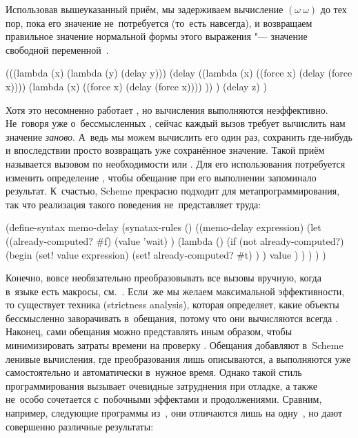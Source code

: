 Использовав вышеуказанный приём, мы задерживаем вычисление $(\omega\ \omega)$ до
тех пор, пока его значение не~потребуется (то~есть навсегда), и возвращаем
правильное значение нормальной формы этого выражения "--- значение свободной
переменной~.

\begin{code:lisp}
(((lambda (x) (lambda (y) (delay y)))
  (delay ((lambda (x) ((force x) (delay (force x))))
          (lambda (x) ((force x) (delay (force x)))) )) )
 (delay z) )
\end{code:lisp}

Хотя это несомненно работает \cite{dh92}, но вычисления выполняются
неэффективно. Не~говоря уже о~бессмысленных , сейчас
каждый вызов  требует вычислить нам значение \emph{заново}. А~ведь
мы можем вычислить его один раз, сохранить где-нибудь и впоследствии просто
возвращать уже сохранённое значение. Такой приём называется вызовом по
необходимости или . Для его использования потребуется изменить
определение , чтобы обещание при его выполнении запоминало результат.
К~счастью, Scheme прекрасно подходит для метапрограммирования, так что
реализация такого поведения не~представляет труда:

\begin{code:lisp}
(define-syntax memo-delay
  (synatax-rules ()
    ((memo-delay expression)
     (let ((already-computed? #f)
           (value 'wait) )
       (lambda ()
         (if (not already-computed?)
             (begin (set! value expression)
                    (set! already-computed? #t) ) )
         value ) ) ) ) )
\end{code:lisp}

Конечно, вовсе необязательно преобразовывать все вызовы вручную, когда в~языке
есть макросы, см.~\cite{dfh86}. Если~же мы желаем максимальной эффективности, то
существует техника  (strictness analysis), которая
определяет, какие объекты бессмысленно заворачивать в~обещания, потому что они
вычисляются всегда \cite{bhy88}. Наконец, сами обещания можно представлять иным
образом, чтобы минимизировать затраты времени на проверку . Обещания добавляют в~Scheme ленивые вычисления,
где преобразования лишь описываются, а выполняются уже самостоятельно и
автоматически в~нужное время. Однако такой стиль программирования вызывает
очевидные затруднения при отладке, а также не~особо сочетается с~побочными
эффектами и продолжениями. Сравним, например, следующие программы
из~\cite{kw90,mor92}, они отличаются лишь на одну~, но дают
совершенно различные результаты:


